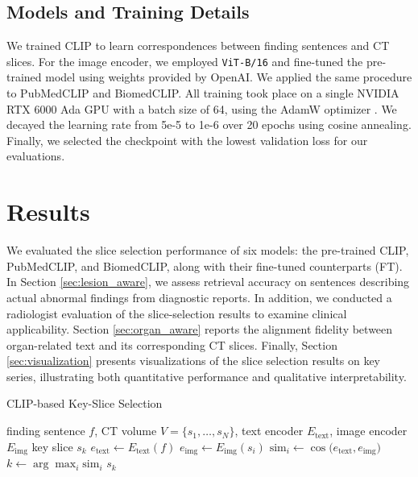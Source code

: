 \documentclass[bioengineering,article,submit,pdftex,moreauthors]{Definitions/mdpi}
\begin{document}
\subsection{Models and Training Details}
We trained CLIP to learn correspondences between finding sentences and CT slices. 
For the image encoder, we employed \texttt{ViT-B/16} and fine-tuned the pre-trained model using weights provided by OpenAI. 
We applied the same procedure to PubMedCLIP and BiomedCLIP.
All training took place on a single NVIDIA RTX 6000 Ada GPU with a batch size of 64, using the AdamW optimizer \cite{loshchilov_fixing_2017}. 
We decayed the learning rate from 5e-5 to 1e-6 over 20 epochs using cosine annealing. 
Finally, we selected the checkpoint with the lowest validation loss for our evaluations.



\section{Results}

We evaluated the slice selection performance of six models: the pre-trained CLIP, PubMedCLIP, and BiomedCLIP, along with their fine-tuned counterparts (FT). 
In Section \ref{sec:lesion_aware}, we assess retrieval accuracy on sentences describing actual abnormal findings from diagnostic reports. 
In addition, we conducted a radiologist evaluation of the slice-selection results to examine clinical applicability.
Section \ref{sec:organ_aware} reports the alignment fidelity between organ-related text and its corresponding CT slices. 
Finally, Section \ref{sec:visualization} presents visualizations of the slice selection results on key series, illustrating both quantitative performance and qualitative interpretability.


\begin{algorithm}
  \caption{CLIP-based Key-Slice Selection}
  \label{alg:key_slice_selection}
  \begin{algorithmic}[1]
    \REQUIRE finding sentence $f$, CT volume $V = \{s_1, \dots, s_N\}$, text encoder $E_{\mathrm{text}}$, image encoder $E_{\mathrm{img}}$
    \ENSURE key slice $s_k$
    \STATE $e_{\mathrm{text}} \leftarrow E_{\mathrm{text}}(f)$ 
      \STATE $e_{\mathrm{img}} \leftarrow E_{\mathrm{img}}(s_i)$ 
      \STATE $\mathrm{sim}_i \leftarrow \cos\bigl(e_{\mathrm{text}}, e_{\mathrm{img}}\bigr)$ 
    \ENDFOR
    \STATE $k \leftarrow \arg\max_i \mathrm{sim}_i$ 
    \RETURN $s_k$
  \end{algorithmic}
\end{algorithm}
\end{document}
